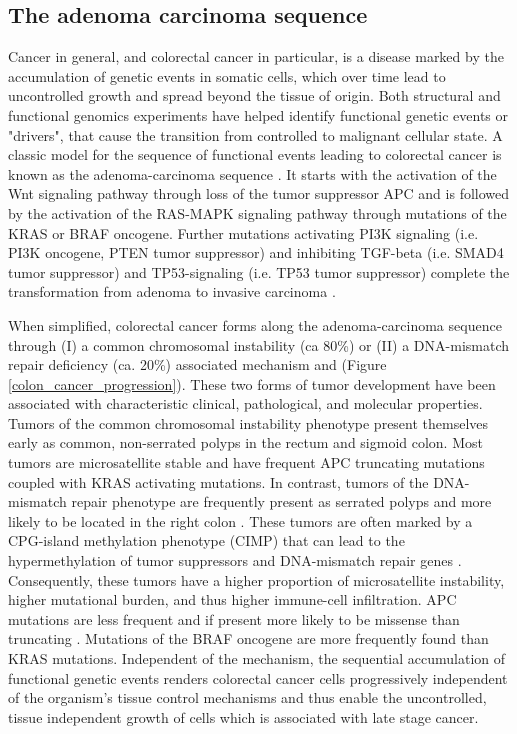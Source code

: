 \begin{flushleft}
\subsection{The adenoma carcinoma sequence}

Cancer in general, and colorectal cancer in particular, is a disease marked by the accumulation of genetic events in somatic cells, which over time lead to uncontrolled growth and spread beyond the tissue of origin. Both structural and functional genomics experiments have helped identify functional genetic events or "drivers", that cause the transition from controlled to malignant cellular state. A classic model for the sequence of functional events leading to colorectal cancer is known as the adenoma-carcinoma sequence \cite{vogelsteinGeneticAlterationsColorectaltumor1988}. It starts with the activation of the Wnt signaling pathway through loss of the tumor suppressor APC and is followed by the activation of the RAS-MAPK signaling pathway through mutations of the KRAS or BRAF oncogene. Further mutations activating PI3K signaling (i.e. PI3K oncogene, PTEN tumor suppressor) and inhibiting TGF-beta (i.e. SMAD4 tumor suppressor) and TP53-signaling (i.e. TP53 tumor suppressor) complete the transformation from adenoma to invasive carcinoma \cite{fearonMolecularGeneticsColorectal2011}. \par

When simplified, colorectal cancer forms along the adenoma-carcinoma sequence through (I) a common chromosomal instability (ca 80\%) or (II) a DNA-mismatch repair deficiency (ca. 20\%) associated mechanism \cite{Markowitz2009} and \cite{pancioneGeneticEpigeneticEvents2012} (Figure \ref{colon_cancer_progression}). These two forms of tumor development have been associated with characteristic clinical, pathological, and molecular properties. Tumors of the common chromosomal instability phenotype present themselves early as common, non-serrated polyps in the rectum and sigmoid colon. Most tumors are microsatellite stable and have frequent APC truncating mutations coupled with KRAS activating mutations. In contrast, tumors of the DNA-mismatch repair phenotype are frequently present as serrated polyps and more likely to be located in the right colon \cite{Markowitz2009}. These tumors are often marked by a CPG-island methylation phenotype (CIMP) that can lead to the hypermethylation of tumor suppressors and DNA-mismatch repair genes \cite{oginoCpGIslandMethylator2009}. Consequently, these tumors have a higher proportion of microsatellite instability, higher mutational burden, and thus higher immune-cell infiltration. APC mutations are less frequent and if present more likely to be missense than truncating \cite{borowskyRoleAPCWNT2018}. Mutations of the BRAF oncogene are more frequently found than KRAS mutations. Independent of the mechanism, the sequential accumulation of functional genetic events renders colorectal cancer cells progressively independent of the organism's tissue control mechanisms and thus enable the uncontrolled, tissue independent growth of cells which is associated with late stage cancer.


\end{flushleft}
